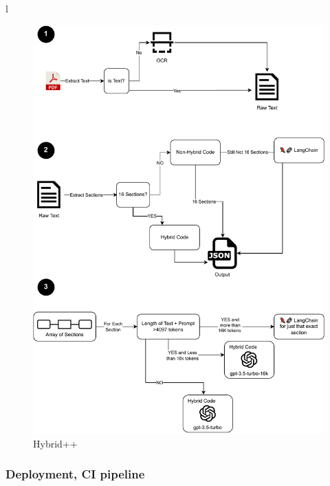 l\documentclass[a4paper,12pt,twoside]{report}
\begin{document}
\begin{figure}[H]
		\includegraphics[width=\textwidth, keepaspectratio ]{images/bigCode}
	\caption[Improvements on Hybrid code]{Hybrid++}
\label{Hybrid++}
\end{figure}
\subsubsection{Deployment, CI pipeline}
\end{document}
